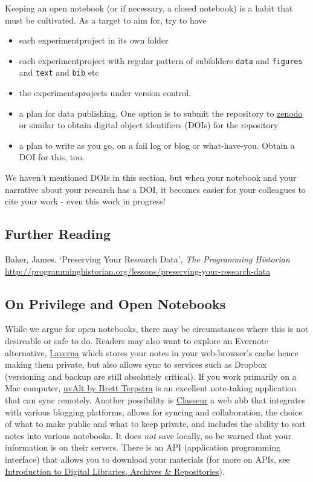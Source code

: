 \documentclass[english,]{book}
\providecommand{\tightlist}{%
  \setlength{\itemsep}{0pt}\setlength{\parskip}{0pt}}
\begin{document}
Keeping an open notebook (or if necessary, a closed notebook) is a habit
that must be cultivated. As a target to aim for, try to have

\begin{itemize}
\tightlist
\item
  each experiment\textbar{}project in its own folder
\item
  each experiment\textbar{}project with regular pattern of subfolders
  \texttt{data} and \texttt{figures} and \texttt{text} and \texttt{bib}
  etc
\item
  the experiments\textbar{}projects under version control.
\item
  a plan for data publishing. One option is to submit the repository to
  \href{http://zenodo.org}{zenodo} or similar to obtain digital object
  identifiers (DOIs) for the repository
\item
  a plan to write as you go, on a fail log or blog or what-have-you.
  Obtain a DOI for this, too.
\end{itemize}

We haven't mentioned DOIs in this section, but when your notebook and
your narrative about your research has a DOI, it becomes easier for your
colleagues to cite your work - even this work in progress!

\subsection{Further Reading}\label{further-reading-1}

Baker, James. `Preserving Your Research Data', \emph{The Programming
Historian}
\url{http://programminghistorian.org/lessons/preserving-your-research-data}

\subsection{On Privilege and Open
Notebooks}\label{on-privilege-and-open-notebooks}

While we argue for open notebooks, there may be circumstances where this
is not desireable or safe to do. Readers may also want to explore an
Evernote alternative, \href{https://laverna.cc/}{Laverna} which stores
your notes in your web-browser's cache hence making them private, but
also allows sync to services such as Dropbox (versioning and backup are
still absolutely critical). If you work primarily on a Mac computer,
\href{http://brettterpstra.com/projects/nvalt/}{nvAlt by Brett Terpstra}
is an excellent note-taking application that can sync remotely. Another
possibility is \href{http://classeur.io/}{Classeur} a web abb that
integrates with various blogging platforms, allows for syncing and
collaboration, the choice of what to make public and what to keep
private, and includes the ability to sort notes into various notebooks.
It does \emph{not} save locally, so be warned that your information is
on their servers. There is an API (application programming interface)
that allows you to download your materials (for more on APIs, see
\protect\hyperlink{introduction-to-digital-libraries-archives-repositories}{Introduction
to Digital Libraries, Archives \& Repositories}).
\end{document}
